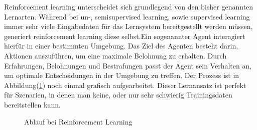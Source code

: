 Reinforcement learning unterscheidet sich grundlegend von den bisher genannten
Lernarten. Während bei un-, semisupervised learning, sowie supervised learning
immer sehr viele Eingabedaten für das Lernsystem bereitgestellt werden müssen,
generiert reinforcement learning diese selbst.Ein sogenannter Agent interagiert
hierfür in einer bestimmten Umgebung. Das Ziel des Agenten besteht darin,
Aktionen auszuführen, um eine maximale Belohnung zu erhalten. Durch
Erfahrungen, Belohnungen und Bestrafungen passt der Agent sein Verhalten an, um
optimale Entscheidungen in der Umgebung zu treffen. Der Prozess ist in
Abbildung(\ref{fig:disreinforcementlearning}) noch einmal grafisch
aufgearbeitet. Dieser Lernansatz ist perfekt für Szenarien, in denen man keine,
oder nur sehr schwierig Trainingsdaten bereitstellen kann.
\cite{lanquillon2019grundzuge}

\begin{figure}[!h]
    \centering
    
    \caption[width=0.4\textwidth]{Ablauf bei Reinforcement Learning}
    \label{fig:disreinforcementlearning}
\end{figure}
